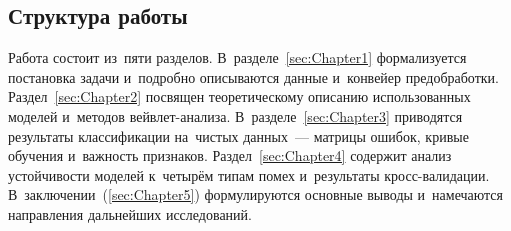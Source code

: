 \subsection*{Структура работы}

Работа состоит из~пяти разделов.
В~разделе~\ref{sec:Chapter1} формализуется постановка задачи и~подробно описываются
данные и~конвейер предобработки.
Раздел~\ref{sec:Chapter2} посвящен теоретическому описанию использованных моделей
и~методов вейвлет-анализа.
В~разделе~\ref{sec:Chapter3} приводятся результаты классификации на~чистых данных~---
матрицы ошибок, кривые обучения и~важность признаков.
Раздел~\ref{sec:Chapter4} содержит анализ устойчивости моделей к~четырём типам
помех и~результаты кросс-валидации.
В~заключении~(\ref{sec:Chapter5}) формулируются основные выводы и~намечаются
направления дальнейших исследований.
